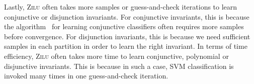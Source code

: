 Lastly, \textsc{Zilu} often takes more samples or guess-and-check iterations to learn conjunctive or disjunction invariants. For conjunctive invariants, this is because the algorithm~\cite{sharma2012interpolants} for learning conjunctive classifiers often requires more samples before convergence. For disjunction invariants, this is because we need sufficient samples in each partition in order to learn the right invariant. In terms of time efficiency, \textsc{Zilu} often takes more time to learn conjunctive, polynomial or disjunctive invariants. This is because in such a case, SVM classification is invoked many times in one guess-and-check iteration.



